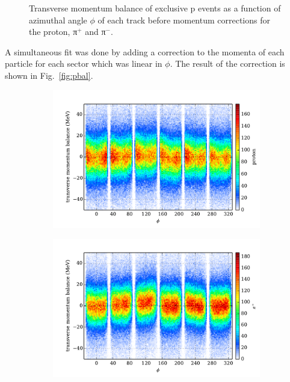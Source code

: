 \begin{figure}
\begin{center}
\begin{subfigure}{0.4\columnwidth}
\end{subfigure}
\caption[Momentum Balance Before Corrections]{\label{fig:pbal.before}Transverse momentum balance of exclusive p \π[+] \π[-] events as a function of azimuthal angle $\phi$ of each track before momentum corrections for the proton, π$^+$ and π$^-$.}
\end{center}\end{figure}

A simultaneous fit was done by adding a correction to the momenta of each particle for each sector which was linear in $\phi$. The result of the correction is shown in Fig.~\ref{fig:pbal}.

\begin{figure}\begin{center}
\begin{subfigure}{0.4\columnwidth}
    \includegraphics[width=\columnwidth]{figures/pcor/pcor_mptbal_fixed_p.pdf}
\end{subfigure}
\begin{subfigure}{0.4\columnwidth}
    \includegraphics[width=\columnwidth]{figures/pcor/pcor_mptbal_fixed_pip.pdf}

\end{subfigure}
\end{center}
\end{figure}
